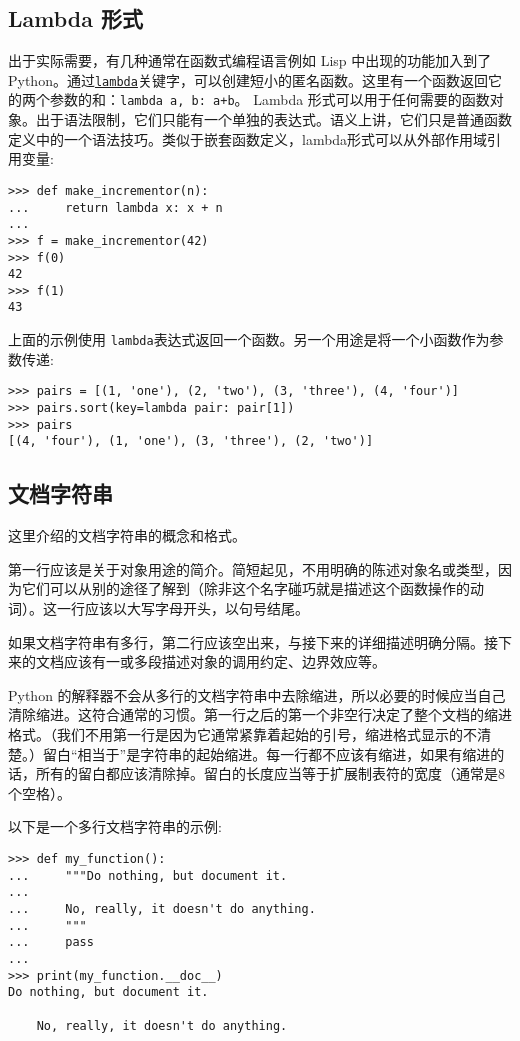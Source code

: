 \subsection{Lambda 形式}
出于实际需要，有几种通常在函数式编程语言例如 Lisp 中出现的功能加入到了 Python。通过\href{https://docs.python.org/3/reference/expressions.html#lambda}{\texttt{lambda}}关键字，可以创建短小的匿名函数。这里有一个函数返回它的两个参数的和：\texttt{lambda a, b: a+b}。 Lambda 形式可以用于任何需要的函数对象。出于语法限制，它们只能有一个单独的表达式。语义上讲，它们只是普通函数定义中的一个语法技巧。类似于嵌套函数定义，lambda形式可以从外部作用域引用变量:
\begin{lstlisting}
>>> def make_incrementor(n):
...     return lambda x: x + n
...
>>> f = make_incrementor(42)
>>> f(0)
42
>>> f(1)
43
\end{lstlisting}
上面的示例使用 \texttt{lambda}表达式返回一个函数。另一个用途是将一个小函数作为参数传递:
\begin{lstlisting}
>>> pairs = [(1, 'one'), (2, 'two'), (3, 'three'), (4, 'four')]
>>> pairs.sort(key=lambda pair: pair[1])
>>> pairs
[(4, 'four'), (1, 'one'), (3, 'three'), (2, 'two')]
\end{lstlisting}
\subsection{文档字符串}
\label{ControlFlowTools:MoreDefFunc:DocString}
这里介绍的文档字符串的概念和格式。

第一行应该是关于对象用途的简介。简短起见，不用明确的陈述对象名或类型，因为它们可以从别的途径了解到（除非这个名字碰巧就是描述这个函数操作的动词）。这一行应该以大写字母开头，以句号结尾。

如果文档字符串有多行，第二行应该空出来，与接下来的详细描述明确分隔。接下来的文档应该有一或多段描述对象的调用约定、边界效应等。

Python 的解释器不会从多行的文档字符串中去除缩进，所以必要的时候应当自己清除缩进。这符合通常的习惯。第一行之后的第一个非空行决定了整个文档的缩进格式。（我们不用第一行是因为它通常紧靠着起始的引号，缩进格式显示的不清楚。）留白“相当于”是字符串的起始缩进。每一行都不应该有缩进，如果有缩进的话，所有的留白都应该清除掉。留白的长度应当等于扩展制表符的宽度（通常是8个空格）。

以下是一个多行文档字符串的示例:
\begin{lstlisting}
>>> def my_function():
...     """Do nothing, but document it.
...
...     No, really, it doesn't do anything.
...     """
...     pass
...
>>> print(my_function.__doc__)
Do nothing, but document it.

    No, really, it doesn't do anything.
\end{lstlisting}
